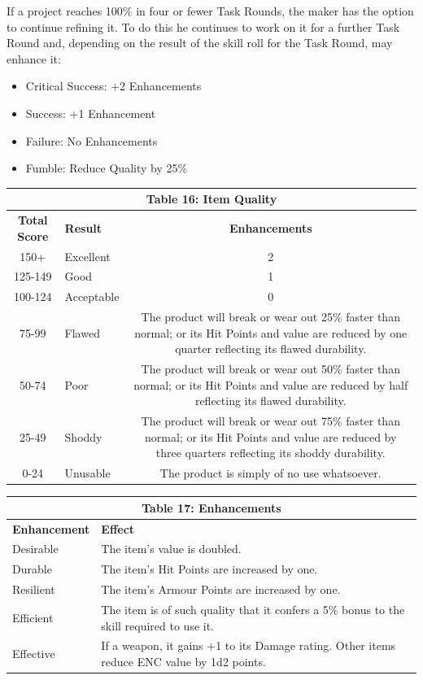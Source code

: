 \documentclass[10pt]{article}
\begin{document}
If a project reaches 100\% in four or fewer Task Rounds, the maker has the option to continue refining it. To do this he continues to work on it for a further Task Round and, depending on the result of the skill roll for the Task Round, may enhance it:

\begin{itemize}
    \item Critical Success: +2 Enhancements
    \item Success: +1 Enhancement
    \item Failure: No Enhancements
    \item Fumble: Reduce Quality by 25\%
\end{itemize}


\begin{longtable}[c]{|c|l|c|}
\hline
\multicolumn{3}{|c|}{\textbf{Table 16: Item Quality}} \\
\hline
\textbf{Total Score} & \textbf{Result} & \textbf{Enhancements} \\
\hline
150+ & Excellent & 2 \\
\hline
125-149 & Good & 1 \\
\hline
100-124 & Acceptable & 0 \\
\hline
75-99 & Flawed & \multicolumn{1}{p{8cm}|}{The product will break or wear out 25\% faster than normal; or its Hit Points and value are reduced by one quarter reflecting its flawed durability.} \\
\hline
50-74 & Poor & \multicolumn{1}{p{8cm}|}{The product will break or wear out 50\% faster than normal; or its Hit Points and value are reduced by half reflecting its flawed durability.} \\
\hline
25-49 & Shoddy & \multicolumn{1}{p{8cm}|}{The product will break or wear out 75\% faster than normal; or its Hit Points and value are reduced by three quarters reflecting its shoddy durability.} \\
\hline
0-24 & Unusable & \multicolumn{1}{p{8cm}|}{The product is simply of no use whatsoever.} \\
\hline
\end{longtable}


\begin{longtable}[c]{|l|p{10cm}|}
\hline
\multicolumn{2}{|c|}{\textbf{Table 17: Enhancements}} \\
\hline
\textbf{Enhancement} & \textbf{Effect} \\
\hline
Desirable & The item's value is doubled. \\
\hline
Durable & The item's Hit Points are increased by one. \\
\hline
Resilient & The item's Armour Points are increased by one. \\
\hline
Efficient & The item is of such quality that it confers a 5\% bonus to the skill required to use it. \\
\hline
Effective & If a weapon, it gains +1 to its Damage rating. Other items reduce ENC value by 1d2 points. \\
\hline
\end{longtable}
\end{document}
